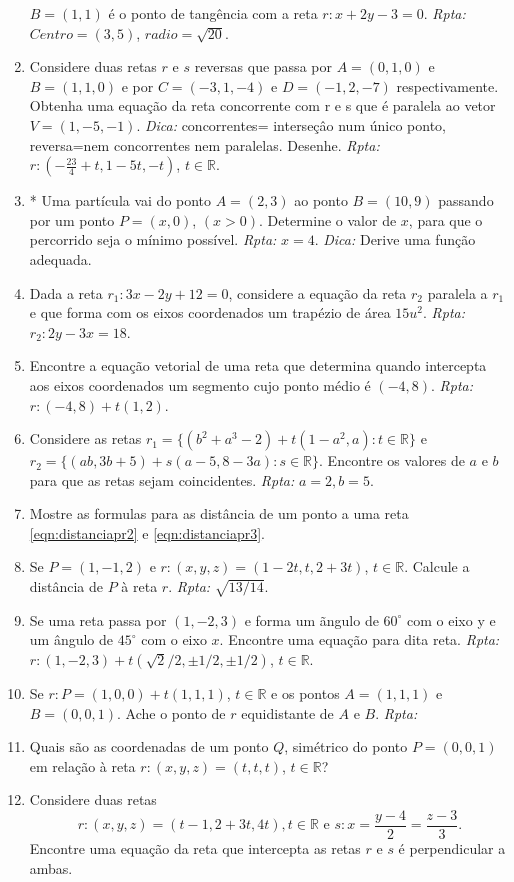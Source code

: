 \documentclass{article}
\theoremstyle{plain}
\theoremstyle{definition}
\theoremstyle{remark}
\begin{document}
\begin{enumerate}
    $B=(1,1)$ é o ponto de tangência com a  reta
    $r: x+2y-3=0$.
    {\it Rpta: } $Centro=(3,5)$, $radio=\sqrt{20}$. 
    \item Considere duas retas $r$ e $s$ reversas que passa por 
    $A=(0,1,0)$  e $B=(1,1,0)$ e por 
    $C=(-3,1,-4)$ e $D=(-1,2,-7)$ respectivamente. Obtenha uma equação da reta 
    concorrente com r e s que é paralela ao vetor $V=(1,-5,-1)$.
    {\it Dica: } concorrentes= interseçâo num único ponto, 
    reversa=nem concorrentes nem paralelas. Desenhe. 
    {\it Rpta: } $r: (-\frac{23}{4}+t, 1-5t,-t)$, $t \in \mathbb{R}$.  
    \item * Uma partícula vai do ponto $A=(2,3)$  
    ao ponto $B=(10,9)$ passando por um ponto $P=(x,0)$, $(x>0)$. Determine o valor de $x$, para que o percorrido seja o mínimo possível. {\it Rpta: } $x=4$. {\it Dica:} Derive uma função adequada.
    
   \item Dada a reta $r_{1}: 3x-2y+12=0$, considere a equação da reta 
   $r_{2}$ paralela a $r_1$ e que forma com os eixos coordenados um 
   trapézio de área $15u^{2}$. {\it Rpta: } $r_{2}: 2y-3x=18$. 
   \item Encontre a equação vetorial de uma reta que determina quando 
   intercepta aos eixos coordenados um segmento cujo 
   ponto médio é $(-4,8)$. {\it Rpta: } $r: (-4,8)+t(1,2)$.  
   \item Considere as retas 
   $r_1=\{(b^2+a^3-2)+t(1-a^2, a): t \in \mathbb{R}\}$  e
   $r_2=\{(ab, 3b+5)+s(a-5,8-3a): s \in \mathbb{R}\}$. 
   Encontre os valores de 
   $a$ e $b$ para que as retas sejam coincidentes. {\it Rpta: }
   $a=2, b=5$. 
   \item Mostre as formulas para as distância de um ponto a uma reta  \eqref{eqn:distanciapr2} e \eqref{eqn:distanciapr3}. 
   \item Se $P=(1,-1,2)$ e $r: (x,y,z)=(1-2t,t,2+3t)$, 
   $t \in \mathbb{R}$. Calcule a  distância de $P$ à reta $r$. {\it Rpta: } $\sqrt{13/14}$.
   \item Se uma reta passa por $(1,-2,3)$ e forma um ãngulo de 
   $60^{\circ}$
   com o eixo y e um ângulo de $45^{\circ}$ com o eixo $x$. Encontre uma equação para dita reta. {\it Rpta: } $r: (1,-2,3)+t(\sqrt{2}/2, \pm 1/2, \pm 1/2)$, $t \in \mathbb{R}$.
   \item Se $r: P=(1,0,0) +t(1,1,1)$, $t \in \mathbb{R}$ e os pontos 
   $A=(1,1,1)$ e $B=(0,0,1)$. Ache o ponto de $r$ equidistante de $A$ e $B$.
   {\it Rpta: }
   \item Quais são as coordenadas de um ponto $Q$, simétrico do ponto $P=(0,0,1)$ em relação à reta $r: (x,y,z)=(t,t,t)$, $t \in \mathbb{R}$?
   \item Considere duas retas
   $$ r: (x,y,z)=(t-1,2+3t, 4t), t \in \mathbb{R} \text{ e }
      s: x=\frac{y-4}{2}=\frac{z-3}{3}.$$
   Encontre uma equação da reta que intercepta as retas $r$ e $s$ é 
   perpendicular a ambas.  
   \end{enumerate}
 
\end{document}
